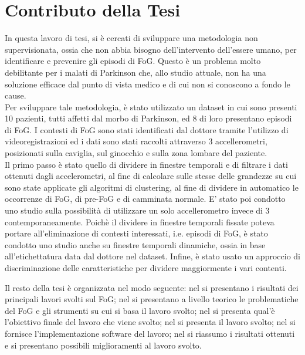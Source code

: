 \section{Contributo della Tesi}\label{cap1:Contributo della Tesi}
In questa lavoro di tesi, si è cercati di sviluppare una metodologia non supervisionata, ossia che non abbia bisogno dell'intervento dell'essere umano, per identificare e prevenire gli episodi di FoG. Questo è un problema molto debilitante per i malati di Parkinson che, allo studio attuale, non ha una soluzione efficace dal punto di vista medico e di cui non si conoscono a fondo le cause.\\
Per sviluppare tale metodologia, è stato utilizzato un dataset in cui sono presenti 10 pazienti, tutti affetti dal morbo di Parkinson, ed 8 di loro presentano episodi di FoG. I contesti di FoG sono stati identificati dal dottore tramite l'utilizzo di videoregistrazioni ed i dati sono stati raccolti attraverso 3 accellerometri, posizionati sulla caviglia, sul ginocchio e sulla zona lombare del paziente.\\
Il primo passo è stato quello di dividere in finestre temporali e di filtrare i dati ottenuti dagli accelerometri, al fine di calcolare sulle stesse delle grandezze su cui sono state applicate gli algoritmi di clustering, al fine di dividere in automatico le occorrenze di FoG, di pre-FoG e di camminata normale. E' stato poi condotto uno studio sulla possibilità di utilizzare un solo accellerometro invece di 3 contemporaneamente. Poichè il dividere in finestre temporali fissate poteva portare all'eliminazione di contesti interessati, i.e. episodi di FoG, è stato condotto uno studio anche su finestre temporali dinamiche, ossia in base all'etichettatura data dal dottore nel dataset. Infine, è stato usato un approccio di discriminazione delle caratteristiche per dividere maggiormente i vari contenti.


Il resto della tesi è organizzata nel modo seguente: nel \textbf{} si presentano i risultati dei principali lavori svolti sul FoG; nel \textbf{} si presentano a livello teorico le problematiche del FoG e gli strumenti su cui si basa il lavoro svolto; nel \textbf{} si presenta qual'è l'obiettivo finale del lavoro che viene svolto; nel \textbf{} si presenta il lavoro svolto; nel \textbf{} si fornisce l'implementazione software del lavoro; nel \textbf{} si riassumo i risultati ottenuti e si presentano possibili miglioramenti al lavoro svolto.
 